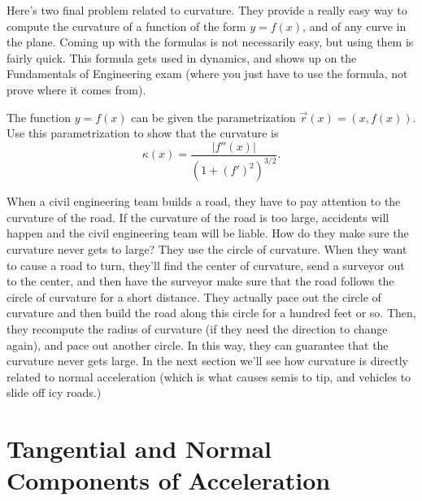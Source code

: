 Here's two final problem related to curvature.  They provide a really easy way to compute the curvature of a function of the form $y=f(x)$, and of any curve in the plane. Coming up with the formulas is not necessarily easy, but using them is fairly quick. This formula gets used in dynamics, and shows up on the Fundamentals of Engineering exam (where you just have to use the formula, not prove where it comes from).
\begin{problem}\label{formula for curvature}
%
 The function $y=f(x)$ can be given the parametrization  $\vec r(x) = (x,f(x))$.  Use this parametrization to show that the curvature is $$\kappa(x) = \frac{|f''(x)|}{(1+(f')^2)^{3/2}}.$$
\end{problem}



When a civil engineering team builds a road, they have to pay attention to the curvature of the road.  If the curvature of the road is too large, accidents will happen and the civil engineering team will be liable. How do they make sure the curvature never gets to large?  They use the circle of curvature. When they want to cause a road to turn, they'll find the center of curvature, send a surveyor out to the center, and then have the surveyor make sure that the road follows the circle of curvature for a short distance. They actually pace out the circle of curvature and then build the road along this circle for a hundred feet or so.  Then, they recompute the radius of curvature (if they need the direction to change again), and pace out another circle.  In this way, they can guarantee that the curvature never gets large. In the next section we'll see how curvature is directly related to normal acceleration (which is what causes semis to tip, and vehicles to slide off icy roads.)

\section{Tangential and Normal Components of Acceleration}


